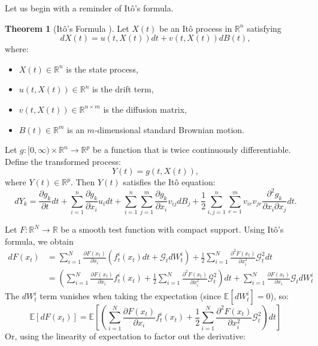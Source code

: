 \documentclass[a4paper,10pt]{article}
\theoremstyle{definition} %
\theoremstyle{definition} %
\theoremstyle{definition} %
\newtheorem{theorem}[definition]{Theorem}
\theoremstyle{definition} %
\newcommand{\0}{\boldsymbol{0}}
\begin{document}
Let us begin with a reminder of Itô's formula.
\begin{theorem}[Itô's Formula \cite{Oksendal2003}]
Let \( X(t) \) be an Itô process in \( \mathbb{R}^n \) satisfying  
\[
dX(t) = u(t, X(t)) dt + v(t, X(t)) dB(t),
\]
where:
\begin{itemize}
    \item[] \( X(t) \in \mathbb{R}^n \) is the state process,
    \item[] \( u(t, X(t)) \in \mathbb{R}^n \) is the drift term,
    \item[] \( v(t, X(t)) \in \mathbb{R}^{n \times m} \) is the diffusion matrix,
    \item[] \( B(t) \in \mathbb{R}^m \) is an \( m \)-dimensional standard Brownian motion.
\end{itemize}
Let \( g: [0, \infty) \times \mathbb{R}^n \to \mathbb{R}^p \) be a function that is twice continuously differentiable.  
Define the transformed process:
\[
Y(t) = g(t, X(t)),
\]
where \( Y(t) \in \mathbb{R}^p \).  
Then \( Y(t) \) satisfies the Itô equation:
\[
dY_k = \frac{\partial g_k}{\partial t} dt 
+ \sum\limits_{i=1}^{n} \frac{\partial g_k}{\partial x_i} u_i dt 
+ \sum\limits_{i=1}^{n} \sum\limits_{j=1}^{m} \frac{\partial g_k}{\partial x_i} v_{ij} dB_j
+ \frac{1}{2} \sum\limits_{i,j=1}^{n} \sum\limits_{r=1}^{m} v_{ir} v_{jr} \frac{\partial^2 g_k}{\partial x_i \partial x_j} dt.
\]
\end{theorem}
Let \( F: \mathbb{R}^N \rightarrow \mathbb{R} \) be a smooth test function with compact support. Using Itô’s formula, we obtain
\begin{align*}
    dF(x_t) &= \sum\limits_{i=1}^N \frac{\partial F(x_t)}{\partial x_i} (f^i_t(x_t)dt + \mathcal{G}_t dW^i_t) + \frac{1}{2} \sum\limits_{i=1}^N  \frac{\partial^2 F(x_t)}{\partial x_i^2} \mathcal{G}_t^2 dt \\
    &= \left(\sum\limits_{i=1}^N \frac{\partial F(x_t)}{\partial x_i} f^i_t(x_t) + \frac{1}{2} \sum\limits_{i=1}^N  \frac{\partial^2 F(x_t)}{\partial x_i^2} \mathcal{G}_t^2\right)dt + \sum\limits_{i=1}^N \frac{\partial F(x_t)}{\partial x_i}  \mathcal{G}_t dW^i_t
\end{align*}
The \( dW_t^i \) term vanishes when taking the expectation (since \( \mathbb{E}[dW_t^i] = 0 \)), so:
\[
\mathbb{E}[dF(x_t)] = \mathbb{E}\left[\left(\sum\limits_{i=1}^N \frac{\partial F(x_t)}{\partial x_i} f^i_t(x_t) + \frac{1}{2} \sum\limits_{i=1}^N \frac{\partial^2 F(x_t)}{\partial x_i^2} \mathcal{G}_t^2\right)dt\right]
\]
Or, using the linearity of expectation to factor out the derivative:
\end{document}
